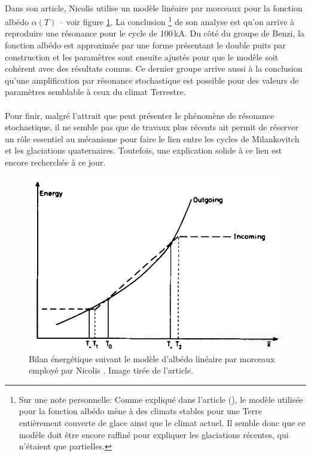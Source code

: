 \paragraph{} Dans son article, Nicolis utilise un modèle linéaire par morceaux pour la fonction albédo $\alpha(T)$ -- voir figure \ref{fig:bilan_thermique_albedo_lineaire}. La conclusion
\footnote{Sur une note personnelle: Comme expliqué dans l'article (\cite{nicolis1982}), le modèle utilisée pour la fonction albédo mène à des climats stables pour une Terre entièrement couverte de glace ainsi que le climat actuel. Il semble donc que ce modèle doit être encore raffiné pour expliquer les glaciations récentes, qui n'étaient que partielles.}
de son analyse est qu'on arrive à reproduire une résonance pour le cycle de 100\,kA. Du côté du groupe de Benzi, la fonction albédo est approximée par une forme présentant le double puits par construction et les paramètres sont ensuite ajustés pour que le modèle soit cohérent avec des résultats connus. Ce dernier groupe arrive aussi à la conclusion qu'une amplification par résonance stochastique est possible pour des valeurs de paramètres semblable à ceux du climat Terrestre. 

\paragraph{} Pour finir, malgré l'attrait que peut présenter le phénomène de résonance stochastique, il ne semble pas que de travaux plus récents ait permit de réserver un rôle essentiel au mécanisme pour faire le lien entre les cycles de Milankovitch et les glaciations quaternaires. Toutefois, une explication solide à ce lien est encore recherchée à ce jour. 

\begin{figure}
	\centering
	\includegraphics[width=0.8\linewidth]{figures/bilan_thermique_albedo_lineaire}
	\caption{Bilan énergétique suivant le modèle d'albédo linéaire par morceaux employé par Nicolis \cite{nicolis1982}. Image tirée de l'article.}
	\label{fig:bilan_thermique_albedo_lineaire}
\end{figure}

